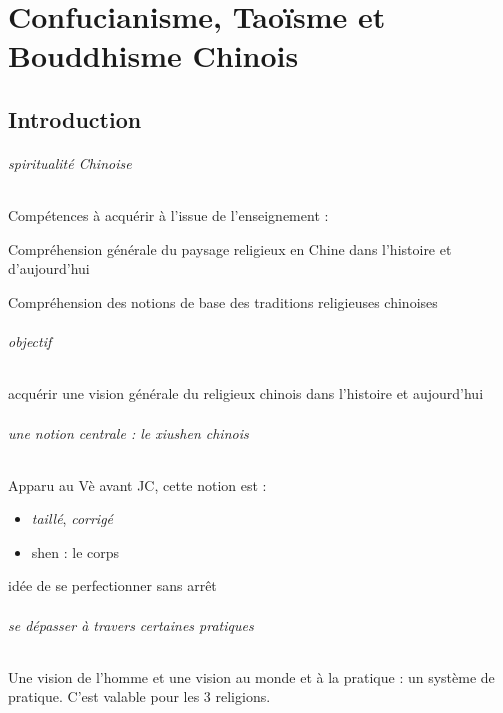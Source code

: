 \part{Confucianisme, Taoïsme et Bouddhisme Chinois}
\chapter{Introduction}


\paragraph{spiritualité Chinoise}
Compétences à acquérir à l’issue de l’enseignement :
\item 	Compréhension générale du paysage religieux en Chine dans l’histoire et d’aujourd’hui
\item 	Compréhension des notions de base des traditions religieuses chinoises

\paragraph{objectif } acquérir une vision générale du religieux chinois dans l'histoire et aujourd'hui


\paragraph{une notion centrale : le xiushen chinois}

\begin{Def}[xiushen]
    Apparu au Vè avant JC, cette notion est :
    \begin{itemize}
        \item \textit{taillé}, \textit{corrigé}
        \item shen : le corps
    \end{itemize}
    idée de se perfectionner sans arrêt
\end{Def}

\paragraph{se dépasser à travers certaines pratiques}
Une vision de l'homme et une vision au monde et à la pratique : un système de pratique. C'est valable pour les 3 religions. 

